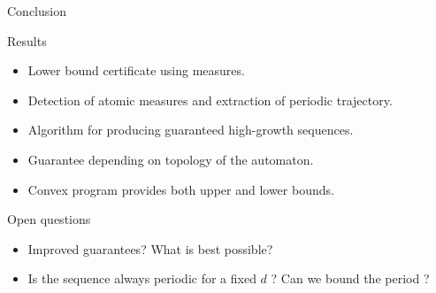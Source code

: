 \documentclass{beamer}
\begin{document}
  \begin{frame}{Conclusion}
    \begin{block}{Results}
      \begin{itemize}
        \item Lower bound \alert{certificate} using measures.
        \item Detection of \alert{atomic} measures and extraction of \alert{periodic} trajectory.
        \item Algorithm for producing \alert{guaranteed} high-growth sequences.
        \item Guarantee depending on \alert{topology} of the automaton.
        \item \alert{Convex} program provides both upper and lower bounds.
      \end{itemize}
    \end{block}
    \begin{block}{Open questions}
      \begin{itemize}
        \item Improved \alert{guarantees}? What is best possible?
        \item Is the sequence always \alert{periodic} for a fixed $d$ ? Can we bound the period ?
      \end{itemize}
    \end{block}
  \end{frame}

  
  
\end{document}
